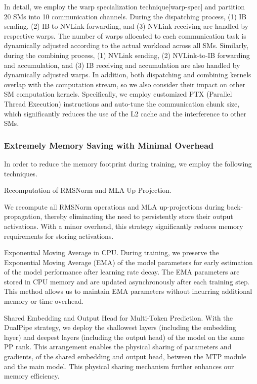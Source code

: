 \documentclass[11pt,a4paper]{article}
\begin{document}
In detail, we employ the warp specialization technique[warp-spec] and partition 20 SMs into 10 communication channels.
During the dispatching process, (1) IB sending, (2) IB-to-NVLink forwarding, and (3) NVLink receiving are handled by respective warps. 
The number of warps allocated to each communication task is dynamically adjusted according to the actual workload across all SMs. 
Similarly, during the combining process, (1) NVLink sending, (2) NVLink-to-IB forwarding and accumulation, and (3) IB receiving and accumulation are also handled by dynamically adjusted warps. 
In addition, both dispatching and combining kernels overlap with the computation stream, so we also consider their impact on other SM computation kernels. 
Specifically, we employ customized PTX (Parallel Thread Execution) instructions and auto-tune the communication chunk size, which significantly reduces the use of the L2 cache and the interference to other SMs.

\subsubsection{Extremely Memory Saving with Minimal Overhead}

In order to reduce the memory footprint during training, we employ the following techniques.

Recomputation of RMSNorm and MLA Up-Projection.

We recompute all RMSNorm operations and MLA up-projections during back-propagation, thereby eliminating the need to persistently store their output activations.
With a minor overhead, this strategy significantly reduces memory requirements for storing activations.

Exponential Moving Average in CPU.
During training, we preserve the Exponential Moving Average (EMA) of the model parameters for early estimation of the model performance after learning rate decay.
The EMA parameters are stored in CPU memory and are updated asynchronously after each training step. 
This method allows us to maintain EMA parameters without incurring additional memory or time overhead.

Shared Embedding and Output Head for Multi-Token Prediction.
With the DualPipe strategy, we deploy the shallowest layers (including the embedding layer) and deepest layers (including the output head) of the model on the same PP rank. 
This arrangement enables the physical sharing of parameters and gradients, of the shared embedding and output head, between the MTP module and the main model.
This physical sharing mechanism further enhances our memory efficiency.
\end{document}
